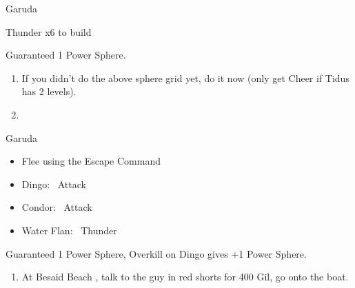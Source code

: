 \begin{battle}{Garuda}
    \begin{itemize}
        \summon{\valefor}
        \valeforf Thunder x6 to build \od
    \end{itemize}
    Guaranteed 1 Power Sphere.
\end{battle}
\begin{enumerate}[resume]
    \item If you didn't do the above sphere grid yet, do it now (only get Cheer if Tidus has 2 levels).
    \item \formation{\tidus}{\yuna}{\lulu}
\end{enumerate}
\begin{battle}{Garuda}
    \begin{itemize}
        \item Flee using the Escape Command
    \end{itemize}
\end{battle}
\begin{encounters}
    \begin{itemize}
        \item Dingo: \tidus\ Attack
        \item Condor: \wakka\ Attack
        \item Water Flan: \lulu\ Thunder
    \end{itemize}
    Guaranteed 1 Power Sphere, Overkill on Dingo gives +1 Power Sphere.
\end{encounters}
\begin{enumerate}[resume]
    \item At Besaid Beach \save, talk to the guy in red shorts for 400 Gil, go onto the boat.
\end{enumerate}
\winnp\lossnp\bothnp
